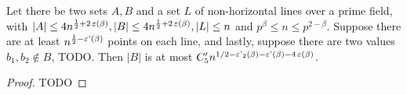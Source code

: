 \begin{theorem}
    \label{ST_grid_final}
    \leanok
    Let there be two sets $A, B$ and a set $L$ of non-horizontal lines over a prime field, 
    with $|A| \leq 4n^{\frac12 + 2\operatorname{\varepsilon}(\beta)}, |B| \leq 4n^{\frac12 + 2\operatorname{\varepsilon}(\beta)}, |L| \leq n$ and $p^\beta \leq n \leq p^{2 - \beta}$.
    Suppose there are at least $n^{\frac12 - \operatorname{\varepsilon'}(\beta)}$ points on each line, and lastly,
    suppose there are two values $b_1, b_2 \notin B$, TODO.
    Then $|B|$ is at most $C'_5 n^{1/2 - \operatorname{\varepsilon'_2}(\beta) - \operatorname{\varepsilon'}(\beta) - 4 \operatorname{\varepsilon}(\beta)}$.
\end{theorem}

\begin{proof}
    \leanok
    TODO
\end{proof}